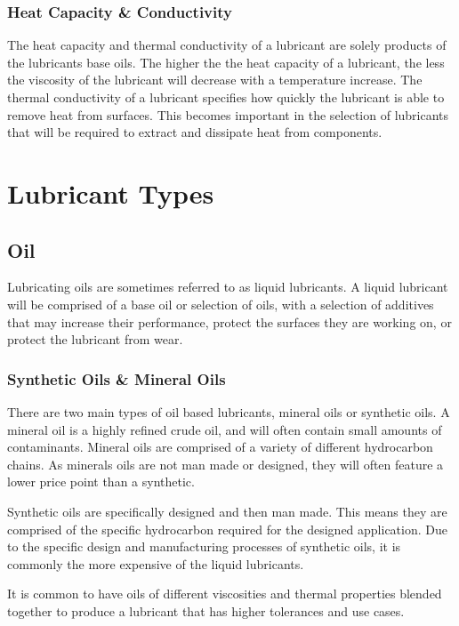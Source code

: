 \documentclass[a4paper,11pt]{article}
\begin{document}
\subsubsection{Heat Capacity \& Conductivity}

The heat capacity and thermal conductivity of a lubricant are solely products of the lubricants base oils. The higher the the heat capacity of a lubricant, the less the viscosity of the lubricant will decrease with a temperature increase. The thermal conductivity of a lubricant specifies how quickly the lubricant is able to remove heat from surfaces. This becomes important in the selection of lubricants that will be required to extract and dissipate heat from components. 


\section{Lubricant Types} 

\subsection{Oil}

Lubricating oils are sometimes referred to as liquid lubricants. A liquid lubricant will be comprised of a base oil or selection of oils, with a selection of additives that may increase their performance, protect the surfaces they are working on, or protect the lubricant from wear.

\subsubsection{Synthetic Oils \& Mineral Oils}

There are two main types of oil based lubricants, mineral oils or synthetic oils. A mineral oil is a highly refined crude oil, and will often contain small amounts of contaminants. Mineral oils are comprised of a variety of different hydrocarbon chains. As minerals oils are not man made or designed, they will often feature a lower price point than a synthetic. 

Synthetic oils are specifically designed and then man made. This means they are comprised of the specific hydrocarbon required for the designed application. Due to the specific design and manufacturing processes of synthetic oils, it is commonly the more expensive of the liquid lubricants.

It is common to have oils of different viscosities and thermal properties blended together to produce a lubricant that has higher tolerances and use cases. 
\end{document}
